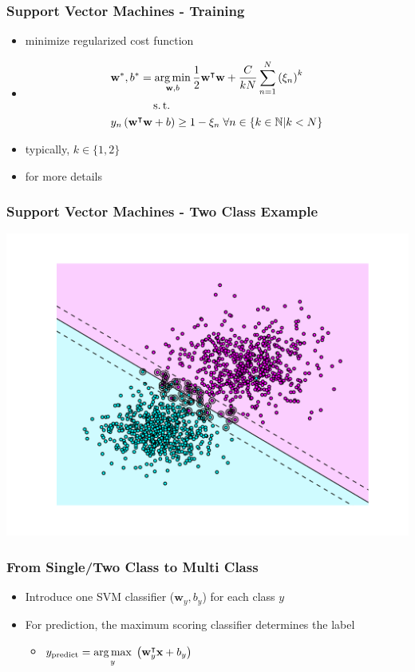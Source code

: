 \begin{frame}
    \frametitle{Support Vector Machines - Training }
    \begin{itemize}
          \item minimize regularized cost function
          \item[] \begin{align}
            &\textbf{w}^*, b^*  = \argmin_{\textbf{w}, b} \frac{1}{2} \textbf{w}^{\intercal} \textbf{w}
            + \frac{C}{kN}\sum_{n=1}^N\left(\xi_n\right)^k \\
            &\phantom{\textbf{w}^*, b^*  = }\st \nonumber \\ 
            &y_n\left(\textbf{w}^\intercal\textbf{w}+b\right) \geq 1 - \xi_n \; \forall n \in \{k \in
            \mathbb{N} | k < N\}
        \end{align}
          \item typically, $k\in\{1,2\}$
        \item {} for more details
    \end{itemize}
\end{frame}


\begin{frame}
    \frametitle{Support Vector Machines - Two Class Example}
    \includegraphics[width=\textwidth]{images/two_class_svm.pdf}
\end{frame}


\begin{frame}
    \frametitle{From Single/Two Class to Multi Class}
    \begin{itemize}
          \item Introduce one SVM classifier ($\textbf{w}_y, b_y$) for each class $y$
          \item For prediction, the maximum scoring classifier determines the label
        \begin{itemize}
              \item[] $\displaystyle y_{\text{predict}} = \operatorname*{arg\,max}_y \;
            \left(\textbf{w}_y^{\intercal}\textbf{x} + b_y\right) $
        \end{itemize}
    \end{itemize}
\end{frame}


